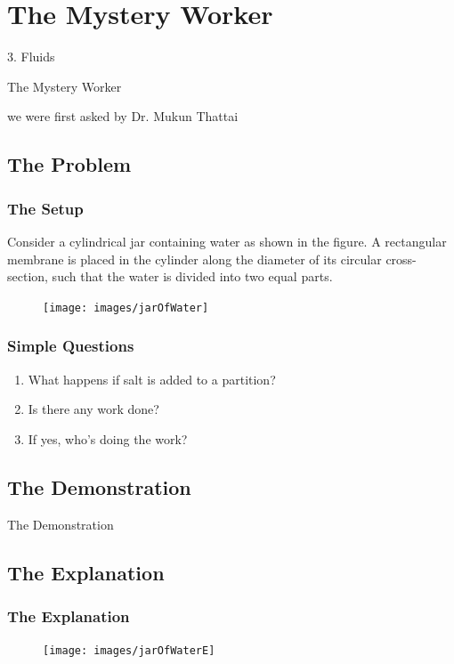 \documentclass{beamer}
\begin{document}
\section{The Mystery Worker}
	\begin{frame}
		3. Fluids
		\Huge{\centerline{The Mystery Worker}}
		\tiny{\centerline{we were first asked by Dr. Mukun Thattai}}
	\end{frame}

	\subsection{The Problem}
		\begin{frame}
		\frametitle{The Setup}
			Consider a cylindrical jar containing water as shown in the figure. A rectangular membrane is placed in the cylinder along the diameter of its circular cross-section, such that the water is divided into two equal parts.
			\begin{figure}
			\texttt{[image: images/jarOfWater]}
			\end{figure}
		\end{frame}

		\begin{frame}
		\frametitle{Simple Questions}
			\begin{enumerate}			
				\item What happens if salt is added to a partition?
				\item Is there any work done?
				\item If yes, who's doing the work?
			\end{enumerate}
		\end{frame}

	\subsection{The Demonstration}
		\begin{frame}
			\Large{\centerline{The Demonstration}}
		\end{frame}

	\subsection{The Explanation}
		\begin{frame}
		\frametitle{The Explanation}
			\begin{figure}
			\texttt{[image: images/jarOfWaterE]}
			\end{figure}
		\end{frame}
\end{document}
